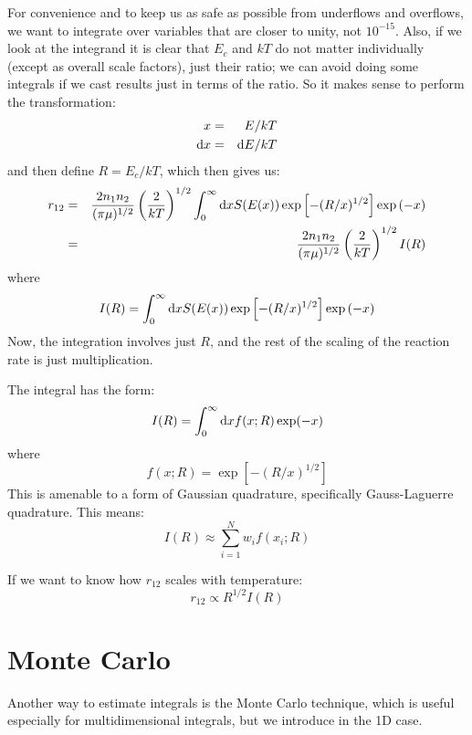 For convenience and to keep us as safe as possible from underflows and
overflows, we want to integrate over variables that are closer to
unity, not $10^{-15}$. Also, if we look at the integrand it is clear
that $E_c$ and $kT$ do not matter individually (except as overall
scale factors), just their ratio; we can avoid doing some integrals if
we cast results just in terms of the ratio.  So it makes sense to
perform the transformation:
\begin{eqnarray}
 x &=& E / kT \cr
 {\rm d}x &=& {\rm d}E / kT
\end{eqnarray}
and then define $R = E_c /kT$,
which then gives us:
\begin{eqnarray}
r_{12} &=& \frac{2 n_1 n_2}{(\pi \mu)^{1/2}}
\left(\frac{2}{kT}\right)^{1/2}
\int_0^\infty {\rm d}x S(E(x))
\exp\left[-(R/x)^{1/2}\right] \exp\left(- x \right) \cr
&=& \frac{2 n_1 n_2}{(\pi \mu)^{1/2}}
\left(\frac{2}{kT}\right)^{1/2} I(R)
\end{eqnarray}
where
\begin{equation}
I(R) = \int_0^\infty {\rm d}x S(E(x))
\exp\left[-(R/x)^{1/2}\right] \exp\left(- x \right) 
\end{equation}
Now, the integration involves just $R$, and the rest of the scaling of
the reaction rate is just multiplication.

The integral has the form:
\begin{equation}
I(R) = \int_0^{\infty} {\rm d}x f(x; R) \exp(-x)
\end{equation}
where
\begin{equation}
f(x; R) = 
\exp\left[-(R/x)^{1/2}\right]
\end{equation}
This is amenable to a form of Gaussian quadrature, specifically
Gauss-Laguerre quadrature. This means:
\begin{equation}
I(R) \approx \sum_{i=1}^N w_i f(x_i; R)
\end{equation}

If we want to know how $r_{12}$ scales with temperature:
\begin{equation}
r_{12} \propto R^{1/2} I(R)
\end{equation}

\section{Monte Carlo}

Another way to estimate integrals is the Monte Carlo technique, which
is useful especially for multidimensional integrals, but we introduce
in the 1D case.

